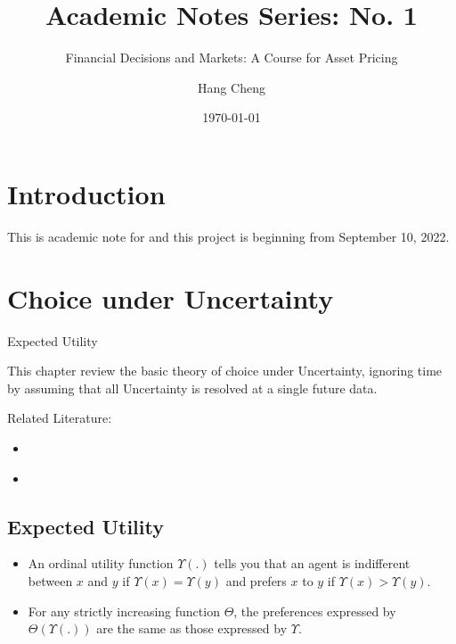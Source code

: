 \documentclass[11pt,green,twocol,citestyle=authoryear, bibstyle=authoryear]{elegantbook}
\title{Academic Notes Series: No. 1}
\subtitle{Financial Decisions and Markets: A Course for Asset Pricing}
\author{Hang Cheng}
\institute{School of Finthch \& DUFE}
\date{\today}
\begin{document}
\maketitle

\frontmatter
\tableofcontents

\mainmatter
\chapter*{Introduction}
This is academic note for \cite{Campbell_2017} and this project is beginning from September 10, 2022.


\chapter{Choice under Uncertainty}

\begin{introduction}
\item Expected Utility 
\end{introduction}

This chapter review the basic theory of choice under Uncertainty, ignoring time by assuming that all Uncertainty is resolved at a single future data. 

Related Literature:

\begin{itemize}
    \item \cite{Gollier_2001}
    \item \cite{Ingersoll_1987}
\end{itemize}

\section{Expected Utility}

\begin{proposition}
    \begin{itemize}
        \item An ordinal utility function $ \Upsilon(.) $ tells you that an agent is indifferent between $ x $ and $ y $ if $ \Upsilon(x)=\Upsilon(y) $  and prefers $ x $ to $ y $ if $ \Upsilon(x)>\Upsilon(y) $.   
        \item For any strictly increasing function $ \Theta $, the preferences expressed by $ \Theta(\Upsilon(.)) $ are the same as those expressed by $ \Upsilon $. 
    \end{itemize}
\end{proposition}
\end{document}
